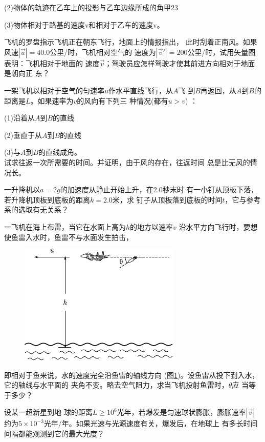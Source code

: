 (2)物体的轨迹在乙车上的投影与乙车边缘所成的角甲23

(3)物体相对于路基的速度v和相对于乙车的速度v。

\exercise 飞机的罗盘指示飞机正在朝东飞行，地面上的情报指出，
此时刮着正南风。如果风速$ | \vec{u} | = 4 0 . 0  $公里/时，飞机相对空气的
速度为$ | \vec{v} ' | = 2 0 0  $公里/时，试用矢量图表明：飞机相对于地面的
速度$\vec{v}$；驾驶员应怎样驾驶才使其前进方向相对于地面是朝向正
东？

\exercise 一架飞机以相对于空气的匀速率$u$作水平直线飞行，从$A$飞
到$B$再返回，从$A$到$B$的距离是$L$。如果速率为$v$的风向有下列三
种情况(都有$ u > v$)  ：

(1)沿着从$A$到$B$的直线

(2)垂直于从$A$到$B$的直线

(3)与$A$到$B$的直线成角。\\
试求往返一次所需要的时间。并证明，由于风的存在，往返时间
总是比无风的情况长。

\exercise 一升降机以$ a = 2 g  $的加速度从静止开始上升，在2.0秒末时
有一小钉从顶板下落，若升降机顶板到底板的距离$ k = 2 . 0  $米，求
钉子从顶板落到底板的时间$t$，它与参考系的选取有无关系？

\exercise 一飞机在海上布雷，当它在水面上高为$h$的地方以速率$v$
沿水平方向飞行时，要想使鱼雷入水时，鱼雷不与水面发生拍击，
\begin{figure}
    \includegraphics{figure/fig02.18}
    \caption{}
    \label{fig:02.18}
\end{figure}
即相对于鱼来说，水的速度完全沿鱼雷的轴线方向
(图\ref{fig:02.18})。设鱼雷从投下到入水，它的轴线与水平面的
夹角不变。略去空气阻力，求当飞机投射鱼雷时，$\theta$应
当等于多少？

\exercise 设某一超新星到地
球的距离$ L \geqslant 1 0 ^ { 6 }  $光年，若爆发是匀速球状膨胀，膨胀速率$|\vec{v}|$约为$5 \times 1 0 ^ { - 3 }  $光年/年。如果光速与光源速度有关，爆发后，在地球上
有多长时间间隔都能观测到它的最大光度？

